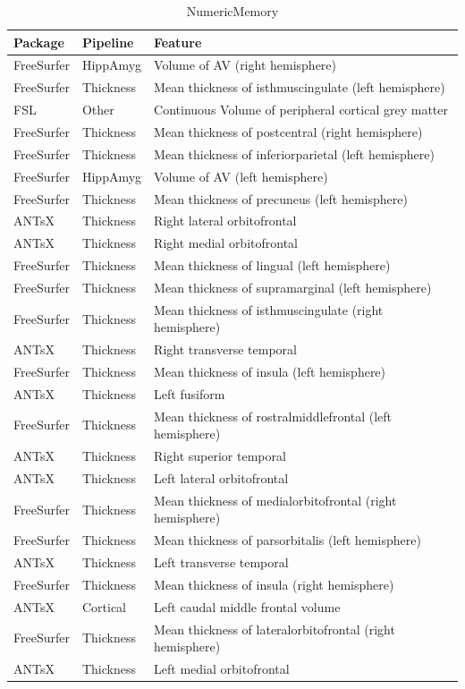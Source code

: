 \documentclass[
  10pt,
]{article}
\begin{document}
\begin{table}

\caption{\label{tab:compare-predictions}NumericMemory}
\centering
\begin{tabular}[t]{lll}
\toprule
Package & Pipeline & Feature\\
\midrule
FreeSurfer & HippAmyg & Volume of AV (right hemisphere)\\
FreeSurfer & Thickness & Mean thickness of isthmuscingulate (left hemisphere)\\
FSL & Other & Continuous    Volume of peripheral cortical grey matter\\
FreeSurfer & Thickness & Mean thickness of postcentral (right hemisphere)\\
FreeSurfer & Thickness & Mean thickness of inferiorparietal (left hemisphere)\\
\addlinespace
FreeSurfer & HippAmyg & Volume of AV (left hemisphere)\\
FreeSurfer & Thickness & Mean thickness of precuneus (left hemisphere)\\
ANTsX & Thickness & Right lateral orbitofrontal\\
ANTsX & Thickness & Right medial orbitofrontal\\
FreeSurfer & Thickness & Mean thickness of lingual (left hemisphere)\\
\addlinespace
FreeSurfer & Thickness & Mean thickness of supramarginal (left hemisphere)\\
FreeSurfer & Thickness & Mean thickness of isthmuscingulate (right hemisphere)\\
ANTsX & Thickness & Right transverse temporal\\
FreeSurfer & Thickness & Mean thickness of insula (left hemisphere)\\
ANTsX & Thickness & Left fusiform\\
\addlinespace
FreeSurfer & Thickness & Mean thickness of rostralmiddlefrontal (left hemisphere)\\
ANTsX & Thickness & Right superior temporal\\
ANTsX & Thickness & Left lateral orbitofrontal\\
FreeSurfer & Thickness & Mean thickness of medialorbitofrontal (right hemisphere)\\
FreeSurfer & Thickness & Mean thickness of parsorbitalis (left hemisphere)\\
\addlinespace
ANTsX & Thickness & Left transverse temporal\\
FreeSurfer & Thickness & Mean thickness of insula (right hemisphere)\\
ANTsX & Cortical & Left caudal middle frontal volume\\
FreeSurfer & Thickness & Mean thickness of lateralorbitofrontal (right hemisphere)\\
ANTsX & Thickness & Left medial orbitofrontal\\
\bottomrule
\end{tabular}
\end{table}
\end{document}
